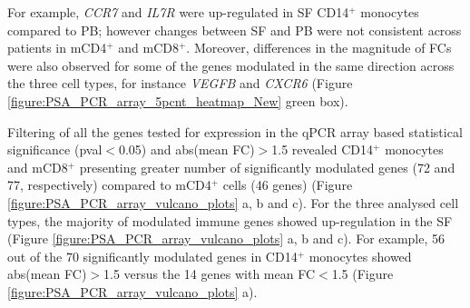 For example, \textit{CCR7} and \textit{IL7R} were up-regulated in SF CD14$^+$ monocytes compared to PB; however changes between SF and PB were not consistent across patients in mCD4$^+$ and mCD8$^+$. Moreover, differences in the magnitude of FCs were also observed for some of the genes modulated in the same direction across the three cell types, for instance \textit{VEGFB} and \textit{CXCR6} (Figure \ref{figure:PSA_PCR_array_5pcnt_heatmap_New} green box).


Filtering of all the genes tested for expression in the qPCR array based statistical significance (pval$<$0.05) and abs(mean FC)$>$1.5 revealed CD14$^+$ monocytes and mCD8$^+$ presenting greater number of significantly modulated genes (72 and 77, respectively) compared to mCD4$^+$ cells (46 genes) (Figure \ref{figure:PSA_PCR_array_vulcano_plots} a, b and c). For the three analysed cell types, the majority of modulated immune genes showed up-regulation in the SF (Figure \ref{figure:PSA_PCR_array_vulcano_plots} a, b and c). For example, 56 out of the 70 significantly modulated genes in CD14$^+$ monocytes showed abs(mean FC)$>$1.5 versus the 14 genes with mean FC$<$1.5 (Figure \ref{figure:PSA_PCR_array_vulcano_plots} a).



